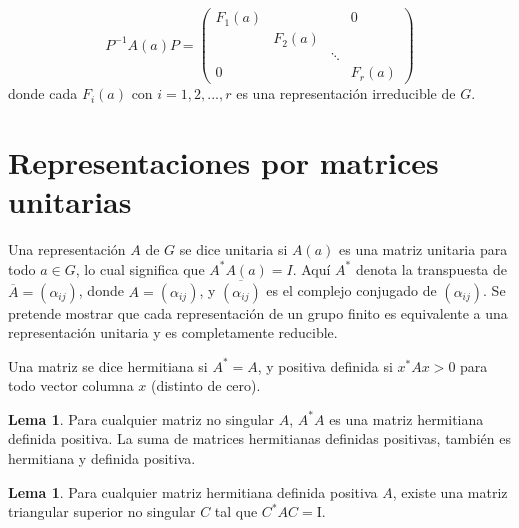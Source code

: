 \documentclass[12pt]{book}
\theoremstyle{definition}
\newtheorem{lemma}[theorem]{Lema}
\newcounter{in}
\newcounter{ini}
\begin{document}
\begin{equation*}
 P^{-1}A\left(a\right)P=
 \begin{pmatrix}
   F_{1}(a) & & & 0\\
   & F_{2}(a) & & \\
   & & \ddots & \\
   0 & & & F_{r}(a)
 \end{pmatrix}
\end{equation*}
donde cada $F_{i}\left(a\right)$ con $i=1,2,...,r$ es una
representación irreducible de $G$.

\section{Representaciones por matrices unitarias}
\label{sec:munitarias}

Una representación $A$ de $G$ se dice unitaria si $A\left(a\right)$ es
una matriz unitaria para todo $a \in G$, lo cual significa que
$A^{*}A\left(a\right)=I$. Aquí $A^{*}$ denota la transpuesta de
$\overline{A}=\left(\alpha_{ij}\right)$, donde
$A=\left(\alpha_{ij}\right)$, y $\overline{\left(\alpha_{ij}\right)}$
es el complejo conjugado de $\left(\alpha_{ij}\right)$. Se pretende
mostrar que cada representación de un grupo finito es equivalente a
una representación unitaria y es completamente reducible.

Una matriz se dice hermitiana si $A^{*}=A$, y positiva definida si
$x^{*}Ax>0$ para todo vector columna $x$ (distinto de cero).

\begin{lemma}
  \label{l2_1}
  Para cualquier matriz no singular $A$, $A^{*}A$ es una matriz
  hermitiana definida positiva. La suma de matrices hermitianas
  definidas positivas, también es hermitiana y definida positiva.

\end{lemma}

\begin{lemma}
  \label{l2_2}
   Para cualquier matriz hermitiana definida positiva
$A$, existe una matriz triangular superior no singular $C$ tal que
$C^{*}AC=\mathrm{I}$.
\end{lemma}
\end{document}

